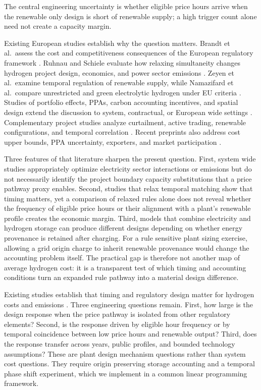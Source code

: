\documentclass[largeformat]{interact}
\begin{document}
The central engineering uncertainty is whether eligible price hours
arrive when the renewable only design is short of renewable supply; a
high trigger count alone need not create a capacity margin.

Existing European studies establish why the question matters. Brandt et
al.~assess the cost and competitiveness consequences of the European
regulatory framework \citep{ref01}. Ruhnau and Schiele evaluate how
relaxing simultaneity changes hydrogen project design, economics, and
power sector emissions \citep{ref02}. Zeyen et al.~examine temporal
regulation of renewable supply, while Namazifard et al.~compare
unrestricted and green electrolytic hydrogen under EU criteria
\citep{ref03,ref04}. Studies of portfolio effects, PPAs, carbon
accounting incentives, and spatial design extend the discussion to
system, contractual, or European wide settings
\citep{ref05,ref06,ref07,ref08,ref16,ref17,ref18,ref20}. Complementary
project studies analyze curtailment, active trading, renewable
configurations, and temporal correlation
\citep{ref09,ref10,ref15,ref21,ref22}. Recent preprints also address
cost upper bounds, PPA uncertainty, exporters, and market participation
\citep{ref11,ref12,ref23,ref24}.

Three features of that literature sharpen the present question. First,
system wide studies appropriately optimize electricity sector
interactions or emissions but do not necessarily identify the project
boundary capacity substitutions that a price pathway proxy enables.
Second, studies that relax temporal matching show that timing matters,
yet a comparison of relaxed rules alone does not reveal whether the
frequency of eligible price hours or their alignment with a plant's
renewable profile creates the economic margin. Third, models that
combine electricity and hydrogen storage can produce different designs
depending on whether energy provenance is retained after charging. For a
rule sensitive plant sizing exercise, allowing a grid origin charge to
inherit renewable provenance would change the accounting problem itself.
The practical gap is therefore not another map of average hydrogen cost:
it is a transparent test of which timing and accounting conditions turn
an expanded rule pathway into a material design difference.

Existing studies establish that timing and regulatory design matter for
hydrogen costs and emissions \citep{ref01,ref02,ref03,ref04}. Three
engineering questions remain. First, how large is the design response
when the price pathway is isolated from other regulatory elements?
Second, is the response driven by eligible hour frequency or by temporal
coincidence between low price hours and renewable output? Third, does
the response transfer across years, public profiles, and bounded
technology assumptions? These are plant design mechanism questions
rather than system cost questions. They require origin preserving
storage accounting and a temporal phase shift experiment, which we
implement in a common linear programming framework.
\end{document}
